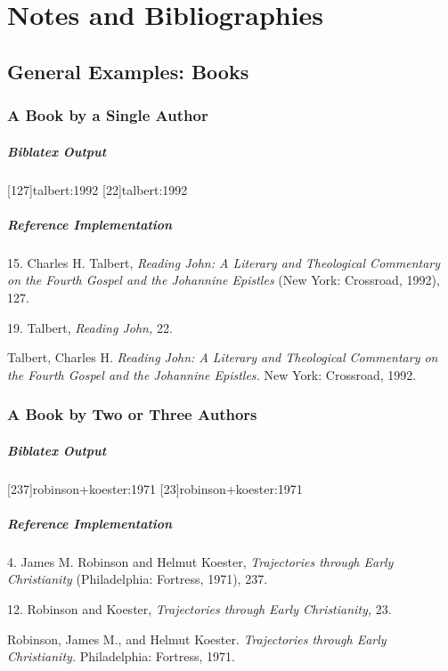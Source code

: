 \documentclass[a4paper]{article}
\newenvironment{biboutput}{%
  \subparagraph{Biblatex Output}
}{\color{black}}
\newenvironment{refimp}{%
  \subparagraph{Reference Implementation}
  \color{reference-colour}
  \rm
}{\par\color{black}}
\begin{document}
\setcounter{section}{5}

\section{Notes and Bibliographies}

\setcounter{subsection}{1}
\subsection{General Examples: Books}

\subsubsection{A Book by a Single Author}

\begin{biboutput}
  [127]{talbert:1992}
  [22]{talbert:1992}
\end{biboutput}

\begin{refimp}
  \hspace*{\bibindent}15. Charles H. Talbert, \emph{Reading John: A Literary
  and Theological Commentary on the Fourth Gospel and the Johannine Epistles}
  (New York: Crossroad, 1992), 127.

  \hspace*{\bibindent}19. Talbert, \emph{Reading John,} 22.

  \hangindent\bibindent Talbert, Charles H. \emph{Reading John: A Literary and
  Theological Commentary on the Fourth Gospel and the Johannine Epistles.} New
  York: Crossroad, 1992.
\end{refimp}

\subsubsection{A Book by Two or Three Authors}

\begin{biboutput}
  [237]{robinson+koester:1971}
  [23]{robinson+koester:1971}
\end{biboutput}

\begin{refimp}
  \hspace*{\bibindent}4. James M. Robinson and Helmut Koester,
  \emph{Trajectories through Early Christianity} (Philadelphia: Fortress,
  1971), 237.

  \hspace*{\bibindent}12. Robinson and Koester, \emph{Trajectories through
  Early Christianity,} 23.

  \hangindent\bibindent Robinson, James M., and Helmut Koester. \emph{Trajectories
  through Early Christianity.} Philadelphia: Fortress, 1971.
\end{refimp}
\end{document}
